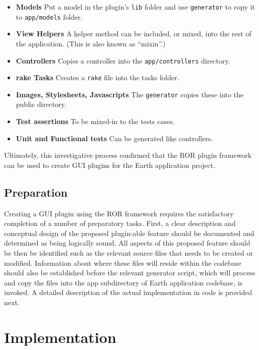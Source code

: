 \documentclass{article}
\begin{document}
\begin{itemize}
    \item{\textbf{Models}} Put a model in the plugin’s \texttt{lib} folder and use \texttt{generator} to copy it to \texttt{app/models} folder.
    \item{\textbf{View Helpers}} A helper method can be included, or mixed, into the rest of the application. (This is also known as ``mixin''.) 
    \item{\textbf{Controllers}} Copies a controller into the \texttt{app/controllers} directory. 
    \item{\textbf{rake Tasks}} Creates a \texttt{rake} file into the tasks folder.
    \item{\textbf{Images, Stylesheets, Javascripts}} The \texttt{generator} copies these into the public directory.
    \item{\textbf{Test assertions}} To be mixed-in to the tests cases.
    \item{\textbf{Unit and Functional tests}} Can be generated like controllers.
\end{itemize}

Ultimately, this investigative process confirmed that the ROR plugin framework can be used to create GUI plugins for the Earth application project.




\subsection{Preparation} %

Creating a GUI plugin using the ROR framework requires the satisfactory completion of a number of preparatory tasks. First, a clear description and conceptual design of the proposed plugin-able feature should be documented and determined as being logically sound. All aspects of this proposed feature should be then be identified such as the relevant source files that needs to be created or modified. Information about where these files will reside within the codebase should also be established before the relevant generator script, which will process and copy the files into the app subdirectory of Earth application codebase, is invoked. A detailed description of the actual implementation in code is provided next.


\section{Implementation} %
\end{document}
